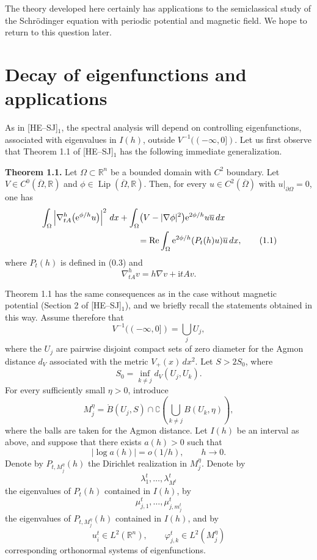 \documentclass[11pt]{article}
\newcommand{\R}{\mathbb{R}}
\newcommand{\Ree}{\operatorname{Re}}
\newcommand{\Lip}{\operatorname{Lip}}
\newcommand{\dd}{\,d}
\newcommand{\ii}{\mathrm{i}}
\newcommand{\e}{\mathrm{e}}
\newcommand{\interior}[1]{\mathring{#1}}
\newcommand{\comp}[1]{\complement\!\left(#1\right)}
\begin{document}
The theory developed here certainly has applications to the semiclassical study of the Schrödinger equation with periodic potential and magnetic field. We hope to return to this question later.

\section{Decay of eigenfunctions and applications}

As in [HE--SJ]$_1$, the spectral analysis will depend on controlling eigenfunctions, associated with eigenvalues in $I(h)$, outside $V^{-1}(( -\infty,0])$. Let us first observe that Theorem 1.1 of [HE--SJ]$_1$ has the following immediate generalization.

\medskip
\noindent\textbf{Theorem 1.1.}
Let $\Omega\subset\R^n$ be a bounded domain with $C^2$ boundary. Let $V\in C^0(\overline\Omega,\R)$ and $\phi\in\Lip(\overline\Omega,\R)$. Then, for every $u\in C^2(\overline\Omega)$ with $u|_{\partial\Omega}=0$, one has
\begin{align}
&\int_\Omega \left|\nabla_{tA}^h\bigl(\e^{\phi/h}u\bigr)\right|^2\dd x
+\int_\Omega \bigl(V-|\nabla\phi|^2\bigr)\e^{2\phi/h}u\overline u\dd x
\notag\\
&\hspace{4cm}=\Ree\int_\Omega \e^{2\phi/h}(P_t(h)u)\overline u\dd x,
\tag{1.1}
\end{align}
where $P_t(h)$ is defined in (0.3) and
\[
\nabla_{tA}^h v=h\nabla v+\ii tAv.
\]

Theorem 1.1 has the same consequences as in the case without magnetic potential (Section 2 of [HE--SJ]$_1$), and we briefly recall the statements obtained in this way.
Assume therefore that
\begin{equation}
V^{-1}(( -\infty,0])=\bigcup_j U_j,
\tag{1.2}
\end{equation}
where the $U_j$ are pairwise disjoint compact sets of zero diameter for the Agmon distance $d_V$ associated with the metric $V_+(x)\,dx^2$.
Let $S>2S_0$, where
\begin{equation}
S_0=\inf_{k\ne j}d_V(U_j,U_k).
\tag{1.3}
\end{equation}
For every sufficiently small $\eta>0$, introduce
\begin{equation}
M_j^\eta=\interior{B}(U_j,S)\cap\comp{\bigcup_{k\ne j}B(U_k,\eta)},
\tag{1.4}
\end{equation}
where the balls are taken for the Agmon distance.
Let $I(h)$ be an interval as above, and suppose that there exists $a(h)>0$ such that
\begin{equation}
|\log a(h)|=o(1/h),\qquad h\to0.
\tag{1.5}
\end{equation}
Denote by $P_{t,M_j^\eta}(h)$ the Dirichlet realization in $M_j^\eta$. Denote by
\[
\lambda_1^t,\ldots,\lambda_{M^t}^t
\]
the eigenvalues of $P_t(h)$ contained in $I(h)$, by
\[
\mu_{j,1}^t,\ldots,\mu_{j,m_j^t}^t
\]
the eigenvalues of $P_{t,M_j^\eta}(h)$ contained in $I(h)$, and by
\[
u_i^t\in L^2(\R^n),\qquad \varphi_{j,k}^t\in L^2(M_j^\eta)
\]
corresponding orthonormal systems of eigenfunctions.
\end{document}
